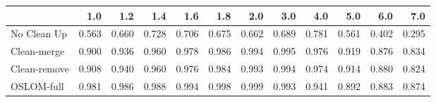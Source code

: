 \begin{tabular}{lrrrrrrrrrrr}
\toprule
{} &   1.0 &   1.2 &   1.4 &   1.6 &   1.8 &   2.0 &   3.0 &   4.0 &   5.0 &   6.0 &   7.0 \\
\midrule
No Clean Up  & 0.563 & 0.660 & 0.728 & 0.706 & 0.675 & 0.662 & 0.689 & 0.781 & 0.561 & 0.402 & 0.295 \\
Clean-merge  & 0.900 & 0.936 & 0.960 & 0.978 & 0.986 & 0.994 & 0.995 & 0.976 & 0.919 & 0.876 & 0.834 \\
Clean-remove & 0.908 & 0.940 & 0.960 & 0.976 & 0.984 & 0.993 & 0.994 & 0.974 & 0.914 & 0.880 & 0.824 \\
OSLOM-full   & 0.981 & 0.986 & 0.988 & 0.994 & 0.998 & 0.999 & 0.993 & 0.941 & 0.892 & 0.883 & 0.874 \\
\bottomrule
\end{tabular}
